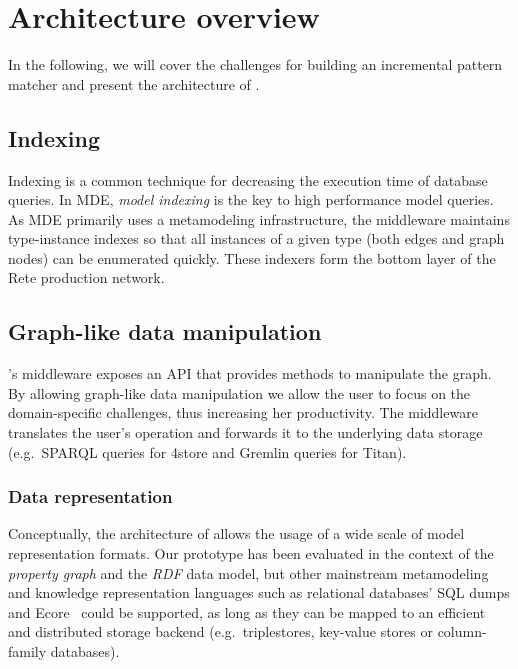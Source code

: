 \section{Architecture overview}
\label{sec:architecture}

In the following, we will cover the challenges for building an incremental pattern matcher and present the architecture of \iqd{}.



\subsection{Indexing}

Indexing is a common technique for decreasing the execution time of database queries. In MDE, \emph{model indexing} is the key to high performance model queries. As MDE primarily uses a metamodeling infrastructure, the \iqd{} middleware maintains type-instance indexes so that all instances of a given type (both edges and graph nodes) can be enumerated quickly. These indexers form the bottom layer of the Rete production network. 

\subsection{Graph-like data manipulation}

\iqd{}'s middleware exposes an API that provides methods to manipulate the graph. By allowing graph-like data manipulation we allow the user to focus on the domain-specific challenges, thus increasing her productivity. The middleware translates the user's operation and forwards it to the underlying data storage (e.g.\ SPARQL queries for 4store and Gremlin queries for Titan).

\subsubsection{Data representation}

Conceptually, the architecture of \iqd{} allows the usage of a wide scale of model representation formats. Our prototype has been evaluated in the context of the \emph{property graph} and the \emph{RDF} data model, but other mainstream metamodeling and knowledge representation languages such as relational databases' SQL dumps and Ecore~\cite{EMF} could be supported, as long as they can be mapped to an efficient and distributed storage backend (e.g.\ triplestores, key-value stores or column-family databases).

